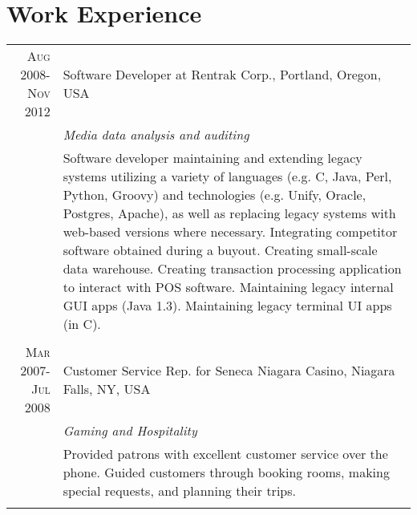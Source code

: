 {{{{{{{{{{{        \section{Work Experience}
        \begin{tabular}{r|p{11cm}}
            \textsc{Aug 2008-Nov 2012}  & Software Developer at Rentrak Corp., Portland, Oregon, USA\\
                                        & \emph{Media data analysis and auditing}\\
                                        & \fontsize{9pt}{10pt}\selectfont
                                                Software developer maintaining and extending legacy systems utilizing a variety
                                                of languages (e.g. C, Java, Perl, Python, Groovy) and technologies (e.g. Unify,
                                                Oracle, Postgres, Apache), as well as replacing legacy systems with web-based
                                                versions where necessary. Integrating competitor software obtained during a
                                                buyout. Creating small-scale data warehouse. Creating transaction processing
                                                application to interact with POS software. Maintaining legacy internal GUI apps
                                                (Java 1.3). Maintaining legacy terminal UI apps (in C). \\
        \multicolumn{2}{c}{}\\
            \textsc{Mar 2007-Jul 2008}   & Customer Service Rep. for Seneca Niagara Casino, Niagara Falls, NY, USA\\
                                            &\emph{Gaming and Hospitality}\\
                                            & \fontsize{9pt}{10pt}\selectfont
                                                            Provided patrons with excellent customer service over the phone. Guided
                                                            customers through booking rooms, making special requests, and planning their
                                                            trips.\\
        \multicolumn{2}{c}{}\\

\end{tabular}}}}}}}}}}}}

